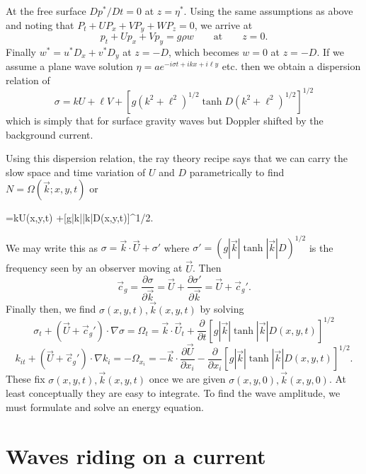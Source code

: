 At the free surface $Dp^*/Dt=0$ at $z=\eta^*$. Using the same assumptions as above
and noting that $P_t+UP_x+VP_y+WP_z=0$, we arrive at
\[
	p_t+Up_x+Vp_y=g\rho w\qquad\text{at}\qquad z=0.
\]
Finally $w^*=u^*D_x+v^*D_y$ at $z=-D$, which becomes $w=0$ at $z=-D$. If we assume
a plane wave solution $\eta=ae^{-i\sigma t+ikx+i\ell y}$ etc. then we obtain a dispersion relation of
\[
	\sigma=kU+\ell V+
	\left[g(k^2+\ell^2)^{1/2}\tanh D(k^2+\ell^2)^{1/2}\right]^{1/2}
\]
which is simply that for surface gravity waves but Doppler shifted by the background
current.

Using this dispersion relation, the ray theory recipe says that we can carry the
slow space and time variation of $U$ and $D$ parametrically to find
$N=\Omega(\vec k;x,y,t)$ or
\begin{waveequation}
	\sigma=\vec k\cdot\vec U(x,y,t)
		+[g|\vec k|\tanh|\vec k|D(x,y,t)]^{1/2}.
\end{waveequation}
We may write this as $\sigma=\vec k\cdot\vec U+\sigma'$ where
$\sigma'=(g|\vec k|\tanh|\vec k|D)^{1/2}$ is the frequency seen
by an observer moving at $\vec U$. Then
\[
	\vec c_g=\frac{\partial\sigma}{\partial\vec k}
	=\vec U+\frac{\partial\sigma'}{\partial\vec k}
	=\vec U+\vec c_g'.
\]
Finally then, we find $\sigma(x,y,t),\vec k(x,y,t)$ by solving
\[
	\sigma_t+(\vec U+\vec c_g')\cdot\nabla\sigma
	=\Omega_t
	=\vec k\cdot\vec U_t
	+\frac{\partial}{\partial t}[g|\vec k|\tanh|\vec k|D(x,y,t)]^{1/2}
\]
\[
	k_{it}+(\vec U+\vec c_g')\cdot\nabla k_i
	=-\Omega_{x_i}
	=-\vec k\cdot\frac{\partial\vec U}{\partial x_i}
	-\frac{\partial}{\partial x_i}[g|\vec k|\tanh|\vec k|D(x,y,t)]^{1/2}.
\]
These fix $\sigma(x,y,t),\vec k(x,y,t)$ once we are given
$\sigma(x,y,0),\vec k(x,y,0)$. At least conceptually they are easy to integrate. To find the wave amplitude, we must
formulate and solve an energy equation.

\sourcepagebreak

\section{Waves riding on a current}

